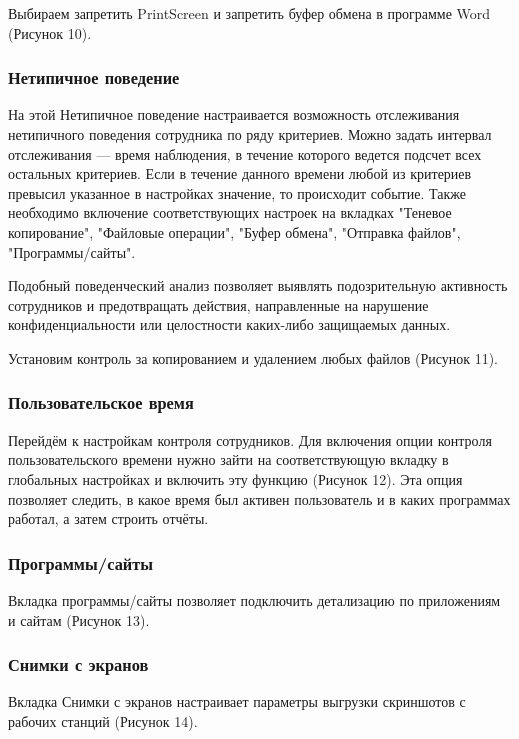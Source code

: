 Выбираем запретить PrintScreen и запретить буфер обмена в программе Word (Рисунок 10).

\FloatBarrier

\subsubsection{Нетипичное поведение}
На этой Нетипичное поведение настраивается возможность отслеживания нетипичного поведения сотрудника по ряду критериев. Можно задать интервал отслеживания — время наблюдения, в течение которого ведется подсчет всех остальных критериев. Если в течение данного времени любой из критериев превысил указанное в настройках значение, то происходит событие. Также необходимо включение соответствующих настроек на вкладках "Теневое копирование", "Файловые операции", "Буфер обмена", "Отправка файлов", "Программы/сайты".

Подобный поведенческий анализ позволяет выявлять подозрительную активность сотрудников и предотвращать действия, направленные на нарушение конфиденциальности или целостности каких-либо защищаемых данных.

Установим контроль за копированием и удалением любых файлов (Рисунок 11).
\FloatBarrier


\subsubsection{Пользовательское время}
Перейдём к настройкам контроля сотрудников. Для включения опции контроля пользовательского времени нужно зайти на соответствующую вкладку в глобальных настройках и включить эту функцию (Рисунок 12). Эта опция позволяет следить, в какое время был активен пользователь и в каких программах работал, а затем строить отчёты.

\FloatBarrier

\subsubsection{Программы/сайты}
Вкладка программы/сайты позволяет подключить детализацию по приложениям и сайтам (Рисунок 13).

\FloatBarrier

\subsubsection{Снимки с экранов}
Вкладка Снимки с экранов настраивает параметры выгрузки скриншотов с рабочих станций (Рисунок 14).

